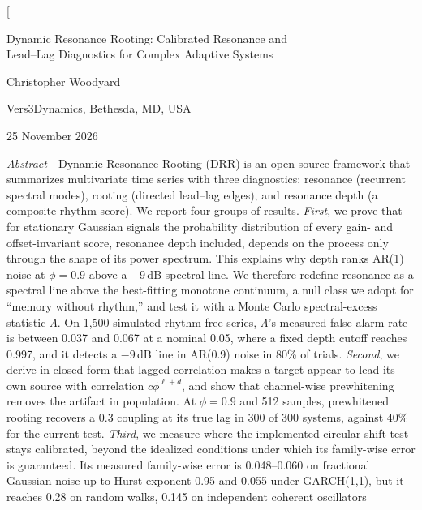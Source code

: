 \documentclass[10pt,twocolumn,letterpaper]{article}
\theoremstyle{definition}
\theoremstyle{remark}
\begin{document}
\twocolumn[{%
\begin{center}
{\LARGE Dynamic Resonance Rooting: Calibrated Resonance and\\[2pt]
Lead--Lag Diagnostics for Complex Adaptive Systems\par}
\vspace{10pt}
{\large Christopher Woodyard\par}
{\small Vers3Dynamics, Bethesda, MD, USA\par}
\vspace{2pt}
{\footnotesize 25 November 2026\par}
\vspace{10pt}
\end{center}
\begin{minipage}{\textwidth}
\small
\noindent\textit{Abstract}---Dynamic Resonance Rooting (DRR) is an open-source
framework that summarizes multivariate time series with three diagnostics:
resonance (recurrent spectral modes), rooting (directed lead--lag edges), and
resonance depth (a composite rhythm score). We report four groups of results.
\emph{First}, we prove that for stationary Gaussian signals the probability
distribution of every gain- and offset-invariant score, resonance depth
included, depends on the process only through the shape of its power spectrum. This explains why depth ranks AR(1) noise at $\phi=0.9$
above a $-9$\,dB spectral line. We therefore redefine resonance as a spectral
line above the best-fitting monotone continuum, a null class we adopt for
``memory without rhythm,'' and test it with a Monte Carlo spectral-excess statistic $\Lambda$. On 1,500
simulated rhythm-free series, $\Lambda$'s measured false-alarm rate is between
0.037 and 0.067 at a nominal 0.05, where a fixed depth cutoff reaches 0.997, and it
detects a $-9$\,dB line in AR(0.9) noise in 80\% of trials. \emph{Second}, we
derive in closed form that lagged correlation makes a target appear to lead its
own source with correlation $c\phi^{\ell+d}$, and show that channel-wise
prewhitening removes the artifact in population. At $\phi=0.9$ and 512 samples,
prewhitened rooting recovers a 0.3 coupling at its true lag in 300 of 300
systems, against 40\% for the current test. \emph{Third}, we measure where the
implemented circular-shift test stays calibrated, beyond the idealized
conditions under which its family-wise error is guaranteed. Its measured
family-wise error is 0.048--0.060 on
fractional Gaussian noise up to Hurst exponent 0.95 and 0.055 under GARCH(1,1),
but it reaches 0.28 on random walks, 0.145 on independent coherent oscillators

\end{minipage}}
\end{document}
